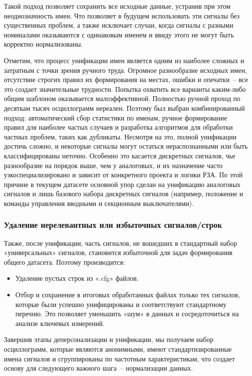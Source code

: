 Такой подход позволяет сохранить все исходные данные, устранив при этом неоднозначность имен. Что позволяет в будущем использовать эти сигналы без существенных проблем, а также исключает случаи, когда сигналы с разными номиналами оказываются с одинаковым именем и ввиду этого не могут быть корректно нормализованы.

Отметим, что процесс унификации имен является одним из наиболее сложных и затратным с точки зрения ручного труда. Огромное разнообразие исходных имен, отсутствие строгих правил их формирования на местах, ошибки и опечатки~-- все это создает значительные трудности. Попытка охватить все варианты каким-либо общим шаблоном оказывается малоэффективной. Полностью ручной проход по десяткам тысяч осциллограмм нереален. Поэтому был выбран комбинированный подход: автоматический сбор статистики по именам, ручное формирование правил для наиболее частых случаев и разработка алгоритмов для обработки частных проблем, таких как дубликаты. Несмотря на это, полной унификации достичь сложно, и некоторые сигналы могут остаться нераспознанными или быть классифицированы неточно. Особенно это касается дискретных сигналов, чье разнообразие на порядок выше, чем у аналоговых, и их назначение часто узкоспециализировано и зависит от конкретного проекта и логики РЗА. По этой причине в текущем датасете основной упор сделан на унификацию аналоговых сигналов и лишь базового набора дискретных сигналов (например, положение и команды управления вводными и секционным выключателями).

\subsubsection{Удаление нерелевантных или избыточных сигналов/строк}\label{sec:ch3_removing_irrelevant_signals}

Также, после унификации, часть сигналов, не вошедших в стандартный набор «универсальных» сигналов, становится избыточной для задач формирования общего датасета. Поэтому производится:

\begin{itemize}
  \item Удаление пустых строк из «.cfg» файлов.
  \item Отбор и сохранение в итоговых обработанных файлах только тех сигналов, которые были успешно унифицированы и соответствуют стандартному перечню. Это позволяет уменьшить «шум» в данных и сосредоточиться на анализе ключевых измерений.
\end{itemize}

Завершив этапы деперсонализации и унификации, мы получаем набор осциллограмм, которые являются анонимными, имеют стандартизированные имена сигналов и сгруппированы по частотным характеристикам, что создает основу для следующего важного шага~-- нормализации данных.


